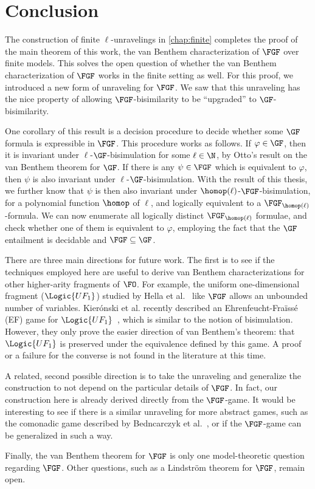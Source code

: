 \chapter{Conclusion}\label{chap:conclusion}
The construction of finite $\ell$-unravelings in \cref{chap:finite} completes the proof of the main theorem of this work, the van Benthem characterization of $\FGF$ over finite models.
This solves the open question of whether the van Benthem characterization of $\FGF$ works in the finite setting as well.
For this proof, we introduced a new form of unraveling for $\FGF$.
We saw that this unraveling has the nice property of allowing $\FGF$-bisimilarity to be ``upgraded'' to $\GF$-bisimilarity.

One corollary of this result is a decision procedure to decide whether some $\GF$ formula is expressible in $\FGF$.
This procedure works as follows.
If $\varphi \in \GF$, then it is invariant under $\ell$-$\GF$-bisimulation for some $\ell \in \N$, by Otto's result on the van Benthem theorem for $\GF$.
If there is any $\psi \in \FGF$ which is equivalent to $\varphi$, then $\psi$ is also invariant under $\ell$-$\GF$-bisimulation.
With the result of this thesis, we further know that $\psi$ is then also invariant under $\homop(\ell)$-$\FGF$-bisimulation, for a polynomial function $\homop$ of $\ell$, and logically equivalent to a $\FGF_{\homop(\ell)}$-formula.
We can now enumerate all logically distinct $\FGF_{\homop(\ell)}$ formulae, and check whether one of them is equivalent to $\varphi$, employing the fact that the $\GF$ entailment is decidable and $\FGF \subseteq \GF$.

There are three main directions for future work.
The first is to see if the techniques employed here are useful to derive van Benthem characterizations for other higher-arity fragments of $\FO$.
For example, the uniform one-dimensional fragment ($\Logic{UF_{1}}$) studied by Hella et al.~\cite{hella2014} like $\FGF$ allows an unbounded number of variables.
Kierónski et al. recently described an Ehrenfeucht-Fraïssé (EF) game for $\Logic{UF_{1}}$~\cite{kieronski2015}, which is similar to the notion of bisimulation.
However, they only prove the easier direction of van Benthem's theorem: that $\Logic{UF_{1}}$  is preserved under the equivalence defined by this game.
A proof or a failure for the converse is not found in the literature at this time.

A related, second possible direction is to take the unraveling and generalize the construction to not depend on the particular details of $\FGF$.
In fact, our construction here is already derived directly from the $\FGF$-game.
It would be interesting to see if there is a similar unraveling for more abstract games, such as the comonadic game described by Bedncarczyk et al.~\cite{bednarczyk2022a}, or if the $\FGF$-game can be generalized in such a way.

Finally, the van Benthem theorem for $\FGF$ is only one model-theoretic question regarding $\FGF$.
Other questions, such as a Lindström theorem for $\FGF$, remain open.
